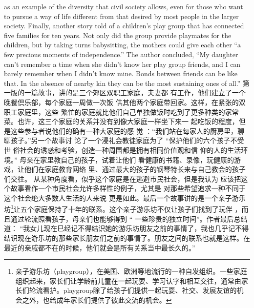 \begin{paracol}{2}
as an example of the diversity that civil society allows, even for
those who want to pursue a way of life different from that desired by most people in the larger society. Finally, another story
told of a children's play group that has connected five families
for ten years. Not only did the group provide playmates for the
children, but by taking turns babysitting, the mothers could
give each other ``a few precious moments of independence.'' The
author concluded, ``{My daughter} can't remember a time when
she didn't know her play group friends, and I can barely remember when I didn't know mine. Bonds between friends can
be like that. In the absence of nearby kin they can be the most
sustaining ones of all.''
\switchcolumn
第一版的一篇故事，讲的是三个郊区双职工家庭，夫妻都
有工作，他们建立了一个晚餐倶乐部，每个家庭一周做一次饭
供其他两个家庭带回家。这样，在紧张的双职工家庭里，这些
繁忙的家庭就比他们自己单独做饭时吃到了更多种类的家常
菜。也许，这三个家庭的关系并没有到像大家庭一样坐下来一
起吃饭的程度，但是这些参与者说他们的确有一种大家庭的感
觉 ：“我们站在每家人的厨房里，聊聊孩子。”另一个故事讨
论了一个浸礼会教徒家庭为了 “保护他们的六个孩子不受世
俗社会的诱惑和考验，创造一种周围都是拥有相同价值观和信
仰的人的生活环境。” 母亲在家里教自己的孩子，试着让他们
看健康的书籍、录像，玩健康的游戏，让他们在家庭教育网络
里、通过最大的孩子的钢琴特长来与自己教会的孩子们交往。
从某种角度看，似乎这个家庭是在逃避市民社会，但是我认为
应该把这个故事看作一个市民社会允许多样性的例子，尤其是
对那些希望追求一种不同于这个社会绝大多数人生活的人来说
更是如此。最后一个故事讲的是一个亲子游乐坊\footnote{亲子游乐坊（playgroup），在美国、欧洲等地流行的一种自发组织。一些家庭组织起来，家长们让学龄前儿童在一起玩耍、学习认字和相互交往，通常由家长们轮流看护。playgroup除了给孩子们提供一起玩耍、社交、发展友谊的机会之外，也给成年家长们提供了彼此交流的机会。}让五个家庭保持了十年的联系。这个亲子游乐坊不仅让孩子们找到了玩伴 ，而且通过轮流照看孩子，母亲们也能够得到 “ 一些珍贵的独立时间”。作者最后总结道： “我女儿现在巳经记不得结识她的游乐坊朋友之前的事情了，我也几乎记不得结识现在游乐坊的那些家长朋友们之前的事情了。朋友之间的联系也就是这样。在最近的亲戚都不在的时候，他们就会是所有关系当中最长久的。”  


\end{paracol}
